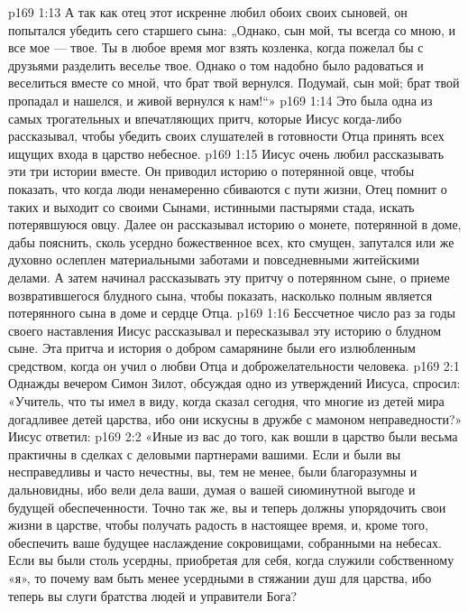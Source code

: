 \vs p169 1:13 А так как отец этот искренне любил обоих своих сыновей, он попытался убедить сего старшего сына: „Однако, сын мой, ты всегда со мною, и все мое --- твое. Ты в любое время мог взять козленка, когда пожелал бы с друзьями разделить веселье твое. Однако о том надобно было радоваться и веселиться вместе со мной, что брат твой вернулся. Подумай, сын мой; брат твой пропадал и нашелся, и живой вернулся к нам!“»
\vs p169 1:14 \pc Это была одна из самых трогательных и впечатляющих притч, которые Иисус когда\hyp{}либо рассказывал, чтобы убедить своих слушателей в готовности Отца принять всех ищущих входа в царство небесное.
\vs p169 1:15 Иисус очень любил рассказывать эти три истории вместе. Он приводил историю о потерянной овце, чтобы показать, что когда люди ненамеренно сбиваются с пути жизни, Отец помнит о таких  и выходит со своими Сынами, истинными пастырями стада, искать потерявшуюся овцу. Далее он рассказывал историю о монете, потерянной в доме, дабы пояснить, сколь усердно божественное  всех, кто смущен, запутался или же духовно ослеплен материальными заботами и повседневными житейскими делами. А затем начинал рассказывать эту притчу о потерянном сыне, о приеме возвратившегося блудного сына, чтобы показать, насколько полным является  потерянного сына в доме и сердце Отца.
\vs p169 1:16 Бессчетное число раз за годы своего наставления Иисус рассказывал и пересказывал эту историю о блудном сыне. Эта притча и история о добром самарянине были его излюбленным средством, когда он учил о любви Отца и доброжелательности человека.
\vs p169 2:1 Однажды вечером Симон Зилот, обсуждая одно из утверждений Иисуса, спросил: «Учитель, что ты имел в виду, когда сказал сегодня, что многие из детей мира догадливее детей царства, ибо они искусны в дружбе с мамоном неправедности?» Иисус ответил:
\vs p169 2:2 \pc «Иные из вас до того, как вошли в царство были весьма практичны в сделках с деловыми партнерами вашими. Если и были вы несправедливы и часто нечестны, вы, тем не менее, были благоразумны и дальновидны, ибо вели дела ваши, думая о вашей сиюминутной выгоде и будущей обеспеченности. Точно так же, вы и теперь должны упорядочить свои жизни в царстве, чтобы получать радость в настоящее время, и, кроме того, обеспечить ваше будущее наслаждение сокровищами, собранными на небесах. Если вы были столь усердны, приобретая для себя, когда служили собственному «я», то почему вам быть менее усердными в стяжании душ для царства, ибо теперь вы слуги братства людей и управители Бога?
